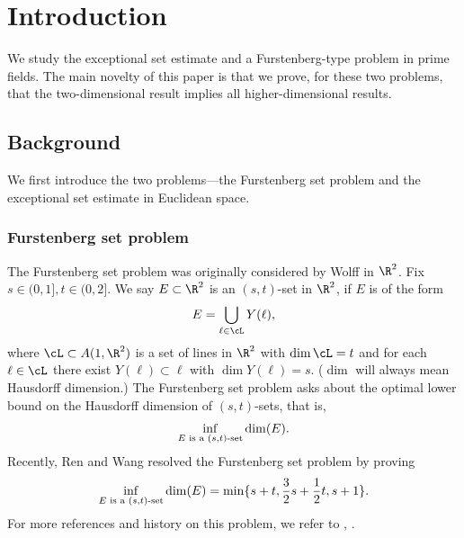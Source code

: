 \section{Introduction}

We study the exceptional set estimate and a Furstenberg-type problem in prime fields. The main novelty of this paper is that we prove, for these two problems, that the two-dimensional result implies all higher-dimensional results. 

\subsection{Background}

We first introduce the two problems---the Furstenberg set problem and the exceptional set estimate in Euclidean space.




\subsubsection{Furstenberg set problem}\hfill

The Furstenberg set problem was originally considered by Wolff \cite{wolff1999recent} in $\R^2$. Fix $s\in (0,1], t\in (0,2]$. We say $E\subset \R^2$ is an $(s,t)$-set in $\R^2$, if $E$ is of the form
\[ E=\bigcup_{\ell\in \cL}Y(\ell), \]
where $\cL\subset A(1,\R^2)$ is a set of lines in $\R^2$ with $\dim\cL=t$ and for each $\ell\in \cL$ there exist $Y(\ell)\subset \ell$ with $\dim Y(\ell)=s$. ($\dim$ will always mean Hausdorff dimension.) The Furstenberg set problem asks about the optimal lower bound on the Hausdorff dimension of $(s,t)$-sets, that is,
\[ \inf_{E \textup{~is~a~}(s,t)\textup{-set}}\dim(E). \]
Recently, Ren and Wang \cite{ren2023furstenberg} resolved the Furstenberg set problem by proving
\begin{equation}\label{renwang}
\inf_{E \textup{~is~a~}(s,t)\textup{-set}}\dim(E)=\min\{s+t,\frac{3}{2}s+\frac{1}{2}t,s+1  \}.
\end{equation} 
For more references and history on this problem, we refer to \cite{ren2023furstenberg}, \cite{orponen2023projections}. 
